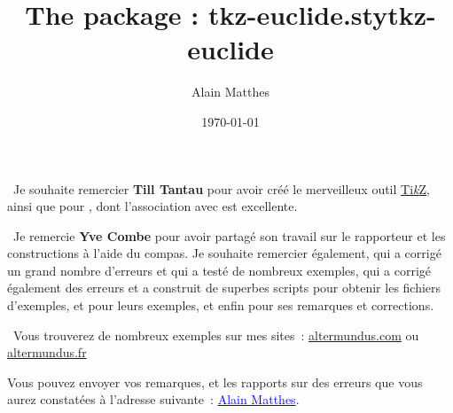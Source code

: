 \documentclass[DIV         = 12,
               fontsize    = 10,
               headinclude = false,
               index       = totoc,
               footinclude = false,
               twoside,
               headings    = small]{tkz-doc}
\title{The package : tkz-euclide.sty}
\author{Alain Matthes}
\gdef\nameofpack{tkz-euclide}
\begin{document}
\title{\nameofpack}
\date{\today}
\clearpage
\thispagestyle{empty}
\maketitle

\clearpage
\pagecolor{fondpaille} 
\color{Maroon}    

\nameoffile{\nameofpack} 

\presentation  

\vspace*{1cm}  
\noindent\lefthand\ Je souhaite remercier \textbf{Till Tantau} pour avoir créé le merveilleux outil \href{http://sourceforge.net/projects/pgf/}{Ti\emph{k}Z}, ainsi que  pour , dont l'association avec  est excellente. 

\vspace*{12pt} 
\noindent\lefthand\ Je  remercie \textbf{Yve Combe} pour avoir partagé son travail sur le rapporteur et les constructions à l'aide du compas. Je souhaite remercier également,   qui a corrigé un grand nombre d'erreurs et qui a testé de nombreux exemples,   qui a corrigé également des erreurs et a construit de superbes scripts pour obtenir les fichiers d'exemples,   et   pour leurs exemples, et enfin   pour ses remarques et corrections.

\vspace*{12pt}
\noindent\lefthand\ Vous trouverez de nombreux exemples sur mes sites~: 
\href{http://altermundus.com/pages/download.html}{altermundus.com} ou 
\href{http://altermundus.fr/pages/download.html}{altermundus.fr}    

\vfill   
Vous pouvez envoyer vos remarques, et les rapports sur des erreurs que vous aurez constatées à l'adresse suivante~: \href{mailto:al.ma@mac.com}{\textcolor{blue}{Alain Matthes}}.
 
\end{document}
